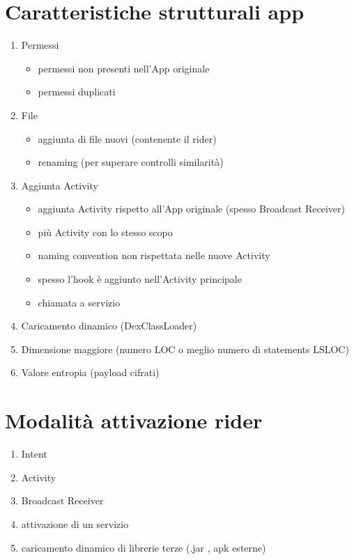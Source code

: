 

\section*{Caratteristiche strutturali app}
\begin{enumerate}
	\item Permessi
	\begin{itemize}
		\item permessi non presenti nell'App originale
		\item permessi duplicati
	\end{itemize}
	\item File
	\begin{itemize}
		\item aggiunta di file nuovi (contenente il rider)
		\item renaming (per superare controlli similarità)
	\end{itemize}
\item Aggiunta Activity
\begin{itemize}
	\item aggiunta Activity rispetto all'App originale (spesso Broadcast Receiver)
	\item più Activity con lo stesso scopo
	\item naming convention non rispettata nelle nuove Activity
	\item spesso l'hook è aggiunto nell'Activity principale
	\item chiamata a servizio
\end{itemize}
\item Caricamento dinamico (DexClassLoader)
\item Dimensione maggiore (numero LOC o meglio numero di statements LSLOC)
\item Valore entropia (payload cifrati)
\end{enumerate}

\section*{Modalità attivazione rider}
\begin{enumerate}
	\item Intent
	\item Activity
	\item Broadcast Receiver
	\item attivazione di un servizio
	\item caricamento dinamico di librerie terze (.jar , apk esterne)
	
\end{enumerate}
